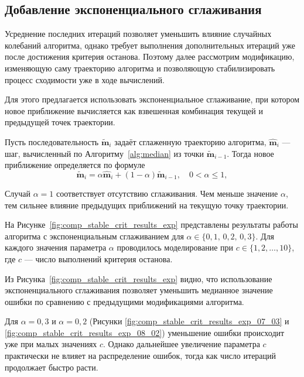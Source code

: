 \subsection{Добавление экспоненциального сглаживания}

Усреднение последних итераций позволяет уменьшить влияние случайных колебаний алгоритма, однако требует выполнения дополнительных итераций уже после достижения критерия останова. Поэтому далее рассмотрим модификацию, изменяющую саму траекторию алгоритма и позволяющую стабилизировать процесс сходимости уже в ходе вычислений.

Для этого предлагается использовать экспоненциальное сглаживание, при котором новое приближение вычисляется как взвешенная комбинация текущей и предыдущей точек траектории.

Пусть последовательность $\widetilde{\mathbf{m}}_i$ задаёт сглаженную траекторию алгоритма, $\widehat{\mathbf{m}}_i$ --- шаг, вычисленный по Алгоритму~\ref{alg:median} из точки $\widetilde{\mathbf{m}}_{i-1}$. Тогда  новое приближение определяется по формуле
\begin{equation}\label{eq:smoothing}
{\widetilde{\mathbf{m}}}_i = \alpha {\widehat{\mathbf{m}}}_i + (1-\alpha) {\widetilde{\mathbf{m}}}_{i-1}, \quad 0 < \alpha \leqslant 1,   
\end{equation}
\vspace{-5ex}


Случай $\alpha = 1$ соответствует отсутствию сглаживания. Чем меньше значение $\alpha$, тем сильнее влияние предыдущих приближений на текущую точку траектории.

На Рисунке~\ref{fig:comp_stable_crit_results_exp}  представлены результаты работы алгоритма с экспоненциальным сглаживанием для $\alpha  \in \{0{,}1, \, 0{,}2, \,  0{,}3\}$. Для каждого значения параметра $\alpha$ проводилось моделирование при $c \in\{1,2,\ldots,10\}$, где $c$ --- число  выполнений критерия останова.

Из Рисунка~\ref{fig:comp_stable_crit_results_exp} видно, что использование экспоненциального сглаживания позволяет уменьшить медианное значение ошибки по сравнению с предыдущими модификациями алгоритма.

Для $\alpha=0{,}3$ и $\alpha=0{,}2$ (Рисунки \ref{fig:comp_stable_crit_results_exp_07_03} и \ref{fig:comp_stable_crit_results_exp_08_02}) уменьшение ошибки происходит уже при малых значениях $c$.  Однако дальнейшее увеличение параметра $c$ практически не влияет на распределение ошибок, тогда как число итераций продолжает быстро расти. 

